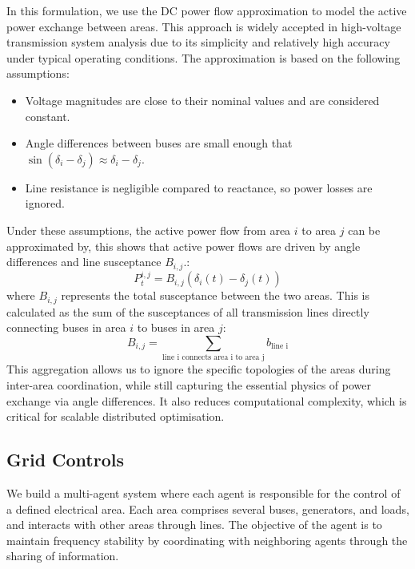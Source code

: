 \documentclass{article}
\begin{document}
In this formulation, we use the DC power flow approximation to model the active power exchange between areas. This approach is widely accepted in high-voltage transmission system analysis due to its simplicity and relatively high accuracy under typical operating conditions. The approximation is based on the following assumptions:
\begin{itemize}
    \item Voltage magnitudes are close to their nominal values and are considered constant.
    \item Angle differences between buses are small enough that $\sin(\delta_i - \delta_j) \approx \delta_i - \delta_j$.
    \item Line resistance is negligible compared to reactance, so power losses are ignored.
\end{itemize}
Under these assumptions, the active power flow from area $i$ to area $j$ can be approximated by, this shows that active power flows are driven by angle differences and line susceptance $B_{i,j}$.:
\begin{equation}
    P^{i,j}_t = B_{i,j}(\delta_i(t) - \delta_j(t))
\end{equation}
where $B_{i,j}$ represents the total susceptance between the two areas. This is calculated as the sum of the susceptances of all transmission lines directly connecting buses in area $i$ to buses in area $j$:
\begin{equation}
    B_{i,j} = \sum_{\text{line i connects area i to area j}} b_{\text{line i}}
\end{equation}
This aggregation allows us to ignore the specific topologies of the areas during inter-area coordination, while still capturing the essential physics of power exchange via angle differences. It also reduces computational complexity, which is critical for scalable distributed optimisation.

\subsection{Grid Controls}
We build a multi-agent system where each agent is responsible for the control of a defined electrical area. Each area comprises several buses, generators, and loads, and interacts with other areas through lines. The objective of the agent is to maintain frequency stability by coordinating with neighboring agents through the sharing of information. 
\end{document}
